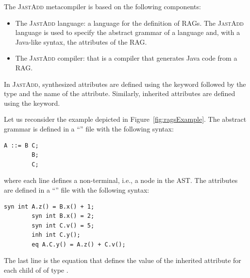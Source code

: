 The \textsc{JastAdd} metacompiler is based on the following components:
\begin{itemize}
    \item The \textsc{JastAdd} language: a language for the definition of RAGs.
    The \textsc{JastAdd} language is used to specify the abstract grammar of a language and, 
    with a Java-like syntax, the attributes of the RAG.
    \item The \textsc{JastAdd} compiler: that is a compiler that generates Java code from a RAG.
\end{itemize}
In \textsc{JastAdd}, synthesized attributes are defined using the  keyword followed
by the type and the name of the attribute. Similarly, inherited attributes are defined
using the  keyword.

Let us reconsider the example depicted in Figure~\ref{fig:ragsExample}.
The abstract grammar is defined in a ``'' file with the following syntax:
    \begin{lstlisting}[language=JastAdd]
        A ::= B C;
        B;
        C;
    \end{lstlisting}
where each line defines a non-terminal, i.e., a node in the AST.
The attributes are defined in a ``'' file with the following syntax:
    \begin{lstlisting}[language=JastAdd]
        syn int A.z() = B.x() + 1;
        syn int B.x() = 2;
        syn int C.v() = 5;
        inh int C.y();
        eq A.C.y() = A.z() + C.v();
    \end{lstlisting}
The last line is the equation that defines the value of the inherited attribute  for each child of  of type .
